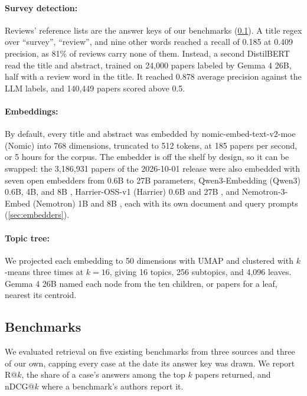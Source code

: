 \paragraph{Survey detection:}
Reviews' reference lists are the answer keys of our benchmarks (\cref{sec:benchmarks}). A title regex over ``survey'', ``review'', and nine other words reached a recall of 0.185 at 0.409 precision, as 81\% of reviews carry none of them. Instead, a second DistilBERT read the title and abstract, trained on 24,000 papers labeled by Gemma 4 26B, half with a review word in the title. It reached 0.878 average precision against the LLM labels, and 140,449 papers scored above 0.5.

\paragraph{Embeddings:}
By default, every title and abstract was embedded by nomic-embed-text-v2-moe (Nomic) \citep{nussbaum2025moe} into 768 dimensions, truncated to 512 tokens, at 185 papers per second, or 5 hours for the corpus. The embedder is off the shelf by design, so it can be swapped: the 3,186,931 papers of the 2026-10-01 release were also embedded with seven open embedders from 0.6B to 27B parameters, Qwen3-Embedding (Qwen3) 0.6B, 4B, and 8B \citep{zhang2025qwen3embedding}, Harrier-OSS-v1 (Harrier) 0.6B and 27B \citep{microsoft2026harrier}, and Nemotron-3-Embed (Nemotron) 1B and 8B \citep{nvidia2026nemotronembed}, each with its own document and query prompts (\cref{sec:embedders}).

\paragraph{Topic tree:}
We projected each embedding to 50 dimensions with UMAP \citep{mcinnes2018umap} and clustered with $k$-means \citep{lloyd1982kmeans} three times at $k=16$, giving 16 topics, 256 subtopics, and 4,096 leaves. Gemma 4 26B named each node from the ten children, or papers for a leaf, nearest its centroid.

\subsection{Benchmarks}
\label{sec:benchmarks}

We evaluated retrieval on five existing benchmarks from three sources and three of our own, capping every case at the date its answer key was drawn. We report R@$k$, the share of a case's answers among the top $k$ papers returned, and nDCG@$k$ where a benchmark's authors report it.

